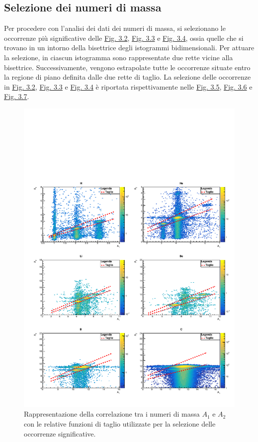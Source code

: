\documentclass[12pt,a4paper,twoside]{report}
\begin{document}
	\subsection{Selezione dei numeri di massa}\label{sec:selection_number_of_mass}
	Per procedere con l'analisi dei dati dei numeri di massa, si selezionano le occorrenze più significative delle \hyperref[fig:a1]{Fig. 3.2}, \hyperref[fig:a2]{Fig. 3.3} e \hyperref[fig:a3]{Fig. 3.4}, ossia quelle che si trovano in un intorno della bisettrice degli istogrammi bidimensionali. Per attuare la selezione, in ciascun istogramma sono rappresentate due rette vicine alla bisettrice. Successivamente, vengono estrapolate tutte le occorrenze situate entro la regione di piano definita dalle due rette di taglio. La selezione delle occorrenze in \hyperref[fig:a1]{Fig. 3.2}, \hyperref[fig:a2]{Fig. 3.3} e \hyperref[fig:a3]{Fig. 3.4} è riportata rispettivamente nelle \hyperref[fig:a1_cut]{Fig. 3.5}, \hyperref[fig:a2_cut]{Fig. 3.6} e \hyperref[fig:a3_cut]{Fig. 3.7}.
	\begin{figure}[H]
		\centering
		\includegraphics[width=1.0\linewidth]{c_MultiCanvasCutLog1.pdf}
		\caption{Rappresentazione della correlazione tra i numeri di massa $A_1$ e $A_2$ con le relative funzioni di taglio utilizzate per la selezione delle occorrenze significative.}
		\label{fig:a1_cut}
	\end{figure}
\end{document}

